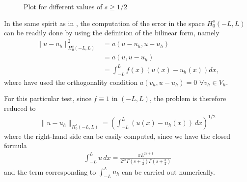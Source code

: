 \begin{figure}[!h]
		\hspace{1cm}
	\caption{Plot for different values of $s\geq 1/2$}
	\label{smas12}
\end{figure}

In the same spirit as in \cite{acosta2017short}, the computation of the error in the space $H_0^s(-L,L)$ can be readily done by using the definition of the bilinear form, namely
%
\begin{align*}
\|u-u_h\|^2_{H_0^s(-L,L)}&=a(u-u_h,u-u_h) \\
&=a(u,u-u_h) \\
&=\int_{-L}^{L}f(x)\left(u(x)-u_h(x)\right)dx,
\end{align*}
%
where have used the orthogonality condition $a(v_h,u-u_h)=0$ $\forall v_h \in V_h$.

For this particular test, since $f\equiv 1$ in $(-L,L)$, the problem is therefore reduced to
%
\begin{align*}
\|u-u_h\|_{H^s_0(-L,L)}=\left(\int_{-L}^{L}\left( u(x)-u_h(x) \right)\,dx\right)^{1/2}
\end{align*}
%
where the right-hand side can be easily computed, since we have the closed formula 
%
\begin{align*}
\int_{-L}^{L}u\,dx= \frac{\pi L^{2s+1}}{2^{2s}\Gamma(s+\frac{1}{2})\Gamma(s+\frac{3}{2})}
\end{align*}
% 
and the term corresponding to $\int_{-L}^{L}u_h$ can be carried out numerically. 

